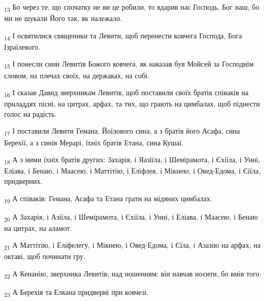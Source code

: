 \begin{tcolorbox}
\textsubscript{13} Бо через те, що спочатку не ви це робили, то вдарив нас Господь, Бог наш, бо ми не шукали Його так, як належало.
\end{tcolorbox}
\begin{tcolorbox}
\textsubscript{14} І освятилися священики та Левити, щоб перенести ковчега Господа, Бога Ізраїлевого.
\end{tcolorbox}
\begin{tcolorbox}
\textsubscript{15} І понесли сини Левитів Божого ковчега, як наказав був Мойсей за Господнім словом, на плечах своїх, на держаках, на собі.
\end{tcolorbox}
\begin{tcolorbox}
\textsubscript{16} І сказав Давид зверхникам Левитів, щоб поставили своїх братів співаків на приладдях пісні, на цитрах, арфах, та тих, що грають на цимбалах, щоб піднести голос на радість.
\end{tcolorbox}
\begin{tcolorbox}
\textsubscript{17} І поставили Левити Гемана, Йоїлового сина, а з братів його Асафа, сина Берехії, а з синів Мерарі, їхніх братів Етана, сина Кушаї.
\end{tcolorbox}
\begin{tcolorbox}
\textsubscript{18} А з ними їхніх братів других: Захарія, і Яазіїла, і Шемірамота, і Єхіїла, і Унні, Еліава, і Бенаю, і Маасею, і Маттітію, і Еліфлея, і Мікнею, і Овед-Едома, і Єіїла, придверних.
\end{tcolorbox}
\begin{tcolorbox}
\textsubscript{19} А співаків: Гемана, Асафа та Етана грати на мідяних цимбалах.
\end{tcolorbox}
\begin{tcolorbox}
\textsubscript{20} А Захарія, і Азіїла, і Шемірамота, і Єхіїла, і Унні, і Еліава, і Маасею, і Бенаю на цитрах, на аламот.
\end{tcolorbox}
\begin{tcolorbox}
\textsubscript{21} А Маттітію, і Еліфелегу, і Мікнею, і Овед-Едома, і Єїла, і Азазію на арфах, на октаві, щоб починати гру.
\end{tcolorbox}
\begin{tcolorbox}
\textsubscript{22} А Кенанію, зверхника Левитів, над ношенням; він навчав носити, бо вмів того.
\end{tcolorbox}
\begin{tcolorbox}
\textsubscript{23} А Берехія та Елкана придверні при ковчезі.
\end{tcolorbox}
